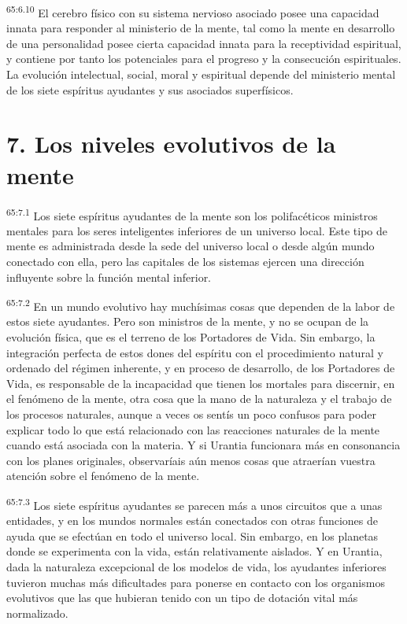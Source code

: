 \par
\textsuperscript{65:6.10} El cerebro físico con su sistema nervioso asociado posee una capacidad innata para responder al ministerio de la mente, tal como la mente en desarrollo de una personalidad posee cierta capacidad innata para la receptividad espiritual, y contiene por tanto los potenciales para el progreso y la consecución espirituales. La evolución intelectual, social, moral y espiritual depende del ministerio mental de los siete espíritus ayudantes y sus asociados superfísicos.

\section*{7. Los niveles evolutivos de la mente}
\par
\textsuperscript{65:7.1} Los siete espíritus ayudantes de la mente son los polifacéticos ministros mentales para los seres inteligentes inferiores de un universo local. Este tipo de mente es administrada desde la sede del universo local o desde algún mundo conectado con ella, pero las capitales de los sistemas ejercen una dirección influyente sobre la función mental inferior.

\par
\textsuperscript{65:7.2} En un mundo evolutivo hay muchísimas cosas que dependen de la labor de estos siete ayudantes. Pero son ministros de la mente, y no se ocupan de la evolución física, que es el terreno de los Portadores de Vida. Sin embargo, la integración perfecta de estos dones del espíritu con el procedimiento natural y ordenado del régimen inherente, y en proceso de desarrollo, de los Portadores de Vida, es responsable de la incapacidad que tienen los mortales para discernir, en el fenómeno de la mente, otra cosa que la mano de la naturaleza y el trabajo de los procesos naturales, aunque a veces os sentís un poco confusos para poder explicar todo lo que está relacionado con las reacciones naturales de la mente cuando está asociada con la materia. Y si Urantia funcionara más en consonancia con los planes originales, observaríais aún menos cosas que atraerían vuestra atención sobre el fenómeno de la mente.

\par
\textsuperscript{65:7.3} Los siete espíritus ayudantes se parecen más a unos circuitos que a unas entidades, y en los mundos normales están conectados con otras funciones de ayuda que se efectúan en todo el universo local. Sin embargo, en los planetas donde se experimenta con la vida, están relativamente aislados. Y en Urantia, dada la naturaleza excepcional de los modelos de vida, los ayudantes inferiores tuvieron muchas más dificultades para ponerse en contacto con los organismos evolutivos que las que hubieran tenido con un tipo de dotación vital más normalizado.

